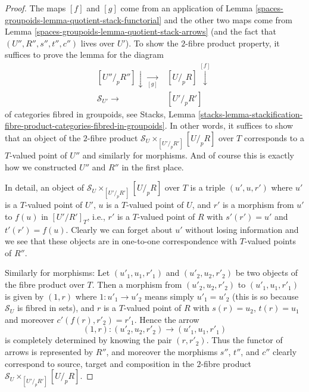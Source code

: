 \begin{proof}
The maps $[f]$ and $[g]$ come from an application of
Lemma \ref{spaces-groupoids-lemma-quotient-stack-functorial}
and the other two maps come from
Lemma \ref{spaces-groupoids-lemma-quotient-stack-arrows}
(and the fact that $(U'', R'', s'', t'', c'')$ lives over $U'$).
To show the $2$-fibre product property, it suffices to prove the lemma
for the diagram
$$
\begin{array}{cc}[U''/_{\!p}R''] \downarrow\underset{[g]}{\longrightarrow} & [U/_{\!p}R] \overset{[f]}{\downarrow} \\ \mathcal{S}_{U'} \longrightarrow & [U'/_{\!p}R']\end{array}
$$
of categories fibred in groupoids, see
Stacks, Lemma
\ref{stacks-lemma-stackification-fibre-product-categories-fibred-in-groupoids}.
In other words, it suffices to show that an object of the $2$-fibre product
$\mathcal{S}_U \times_{[U'/_{\!p}R']} [U/_{\!p}R]$ over $T$ corresponds
to a $T$-valued point of $U''$ and similarly for morphisms. And of course
this is exactly how we constructed $U''$ and $R''$ in the first place.

\medskip\noindent
In detail, an object of $\mathcal{S}_U \times_{[U'/_{\!p}R']} [U/_{\!p}R]$
over $T$ is a triple $(u', u, r')$ where $u'$ is a $T$-valued point of $U'$,
$u$ is a $T$-valued point of $U$, and $r'$ is a morphism from $u'$ to
$f(u)$ in $[U'/R']_T$, i.e., $r'$ is a $T$-valued point of $R$ with
$s'(r') = u'$ and $t'(r') = f(u)$. Clearly we can forget about $u'$
without losing information and we see that these objects are in one-to-one
correspondence with $T$-valued points of $R''$.

\medskip\noindent
Similarly for morphisms: Let $(u'_1, u_1, r'_1)$ and $(u'_2, u_2, r'_2)$ be
two objects of the fibre product over $T$. Then a morphism from
$(u'_2, u_2, r'_2)$ to $(u'_1, u_1, r'_1)$
is given by $(1, r)$ where $1 : u'_1 \to u'_2$ means simply $u'_1 = u'_2$
(this is so because $\mathcal{S}_U$ is fibred in sets), and $r$ is a
$T$-valued point of $R$ with $s(r) = u_2$, $t(r) = u_1$ and moreover
$c'(f(r), r'_2) = r'_1$. Hence the arrow
$$
(1, r) : (u'_2, u_2, r'_2) \to (u'_1, u_1, r'_1)
$$
is completely determined by knowing the pair $(r, r'_2)$. Thus the functor
of arrows is represented by $R''$, and moreover the morphisms $s''$, $t''$,
and $c''$ clearly correspond to source, target and composition in
the $2$-fibre product $\mathcal{S}_U \times_{[U'/_{\!p}R']} [U/_{\!p}R]$.
\end{proof}


